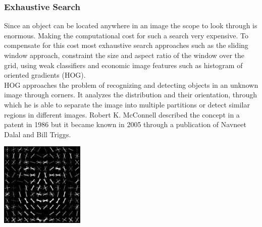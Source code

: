 \subsubsection{Exhaustive Search}
Since an object can be located anywhere in an image the scope to look through is enormous. Making the computational cost for such a search very
expensive. To compensate for this cost most exhaustive search approaches such as the sliding window approach, constraint the size and aspect
ratio of the window over the grid, using weak classifiers and economic image features such as histogram of oriented gradients
(HOG).\cite{selectivesearch} \\ 
HOG approaches the problem of recognizing and detecting objects in an unknown image through corners. It analyzes the distribution and their
orientation, through which he is able to separate the image into multiple partitions or detect similar regions in different images.
Robert K. McConnell described the concept in a patent in 1986 but it became known in 2005 through a publication of Navneet Dalal and Bill
Triggs.\cite{hog}
\begin{center}
    \includegraphics[width=0.3\textwidth]{images/object_detection/Dlib_Learned-HOG-Detector.jpg} \cite{hog}
\end{center}

